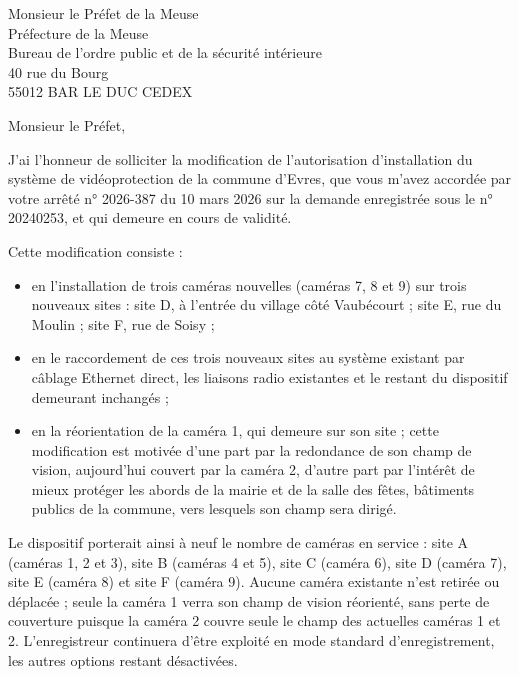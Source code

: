 \documentclass[12pt]{lettre}
\begin{document}
\begin{letter}{Monsieur le Préfet de la Meuse\\Préfecture de la Meuse\\Bureau de l'ordre public et de la sécurité intérieure\\40 rue du Bourg\\55012 BAR LE DUC CEDEX}


\address{Clément \textsc{Fevez}\\ Maire de Evres\\Place de la Halle\\55250 EVRES}
\nofax


\def\concname{Objet :~}

\opening{Monsieur le Préfet,}
J'ai l'honneur de solliciter la modification de l'autorisation d'installation du système de vidéoprotection de la commune d'Evres, que vous m'avez accordée par votre arrêté n° 2026-387 du 10 mars 2026 sur la demande enregistrée sous le n° 20240253, et qui demeure en cours de validité.

Cette modification consiste :

\begin{itemize}
\item en l'installation de trois caméras nouvelles (caméras 7, 8 et 9) sur trois nouveaux sites : site D, à l'entrée du village côté Vaubécourt ; site E, rue du Moulin ; site F, rue de Soisy ;
\item en le raccordement de ces trois nouveaux sites au système existant par câblage Ethernet direct, les liaisons radio existantes et le restant du dispositif demeurant inchangés ;
\item en la réorientation de la caméra 1, qui demeure sur son site ; cette modification est motivée d'une part par la redondance de son champ de vision, aujourd'hui couvert par la caméra 2, d'autre part par l'intérêt de mieux protéger les abords de la mairie et de la salle des fêtes, bâtiments publics de la commune, vers lesquels son champ sera dirigé.
\end{itemize}

Le dispositif porterait ainsi à neuf le nombre de caméras en service : site A (caméras 1, 2 et 3), site B (caméras 4 et 5), site C (caméra 6), site D (caméra 7), site E (caméra 8) et site F (caméra 9). Aucune caméra existante n'est retirée ou déplacée ; seule la caméra 1 verra son champ de vision réorienté, sans perte de couverture puisque la caméra 2 couvre seule le champ des actuelles caméras 1 et 2. L'enregistreur continuera d'être exploité en mode standard d'enregistrement, les autres options restant désactivées.


\end{letter}
\end{document}
